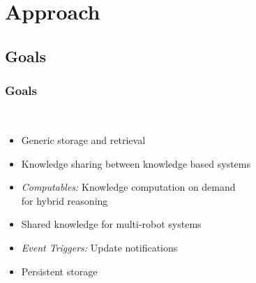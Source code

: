 \section{Approach}
\subsection{Goals}

\begin{frame}
  \frametitle{Goals}
\begin{description}[]
  \item[What should the robot memory be capable of?] \hfill \\
  \begin{itemize}
    \item Generic storage and retrieval
    \item Knowledge sharing between knowledge based systems
    \item \textit{Computables:} Knowledge computation on demand\\ for hybrid reasoning
    \item Shared knowledge for multi-robot systems
    \item \textit{Event Triggers:} Update notifications
    \item Persistent storage
  \end{itemize}
  \end{description}
\end{frame}

